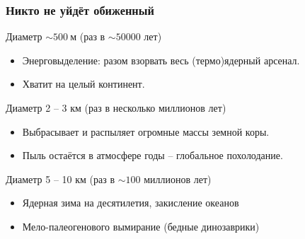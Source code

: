 \documentclass[aspectratio=169]{beamer}
\begin{document}
\begin{frame}
\frametitle{Никто не уйдёт обиженный}

\begin{block}{Диаметр $\sim 500 \: \mathrm{\text{м}}$ (раз в $\sim 50000$ лет)}
\begin{itemize}
\item Энерговыделение: разом взорвать весь (термо)ядерный арсенал.
\item Хватит на целый континент.
\end{itemize}
\end{block}

\begin{block}{Диаметр 2 -- 3 км (раз в несколько миллионов лет)}
\begin{itemize}
\item Выбрасывает и распыляет огромные массы земной коры.
\item Пыль остаётся в атмосфере годы -- глобальное похолодание.
\end{itemize}
\end{block}

\begin{block}{Диаметр 5 -- 10 км (раз в $\sim 100$ миллионов лет)}
\begin{itemize}
\item Ядерная зима на десятилетия, закисление океанов
\item Мело-палеогенового вымирание (бедные динозаврики)
\end{itemize}
\end{block}
\end{frame}
\end{document}
